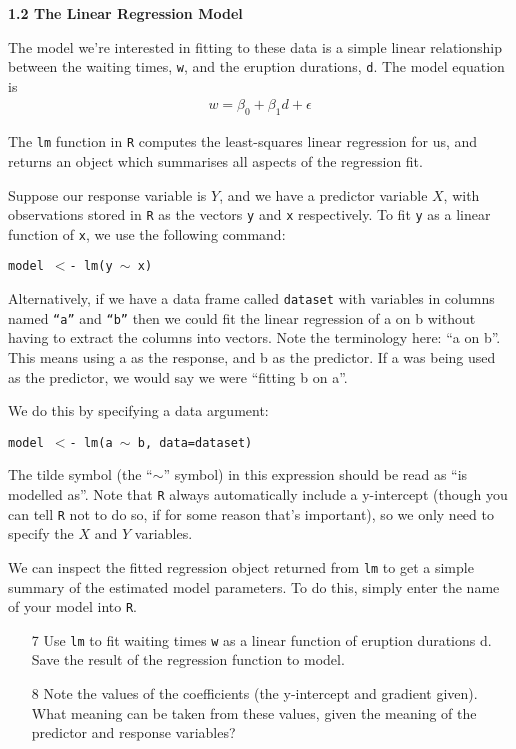 \documentclass[11pt,a4paper]{article}
\begin{document}
\newpage

\textbf{1.2 The Linear Regression Model}

The model we’re interested in fitting to these data is a simple linear relationship between the waiting times, \texttt{w},
and the eruption durations, \texttt{d}. The model equation is
\begin{eqnarray*}
w=\beta_0+\beta_1d+\epsilon
\end{eqnarray*}

The \texttt{lm} function in \texttt{R} computes the least-squares linear regression for us, and returns an object which summarises all aspects of the regression fit.

Suppose our response variable is $Y$, and we have a predictor variable $X$, with observations stored in \texttt{R} as the vectors \texttt{y} and \texttt{x} respectively. To fit \texttt{y} as a linear function of \texttt{x}, we use the following command:

\texttt{model $<$- lm(y $\sim$ x)}

Alternatively, if we have a data frame called \texttt{dataset} with variables in columns named \texttt{``a''} and \texttt{``b''} then we could fit the linear regression of a on b without having to extract the columns into vectors.  Note the terminology here: ``a on b''. This means using a as the response, and b as the predictor. If a was being used as the predictor, we would say we were ``fitting b on a''.



We do this by specifying a data argument:

\texttt{model $<$- lm(a $\sim$ b, data=dataset)}

The tilde symbol (the ``$\sim$'' symbol) in this expression should be read as “is modelled as”. Note that \texttt{R} always automatically include a y-intercept (though you can tell \texttt{R} not to do so, if for some reason that's important), so we only need to specify the $X$
 and $Y$
 variables. 

We can inspect the fitted regression object returned from \texttt{lm} to get a simple summary of the estimated model parameters. To do this, simply enter the name of your model into \texttt{R}.








\begin{enumerate}
\item[7] Use \texttt{lm} to fit waiting times \texttt{w} as a linear function of eruption durations d. Save the result of the regression function to model.
\item[8] Note the values of the coefficients (the y-intercept and gradient given). What meaning can be taken from these values, given the meaning of the predictor and response variables?
\end{enumerate} 
\end{document}
